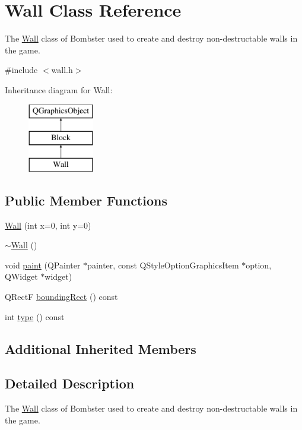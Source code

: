 \hypertarget{class_wall}{\section{Wall Class Reference}
\label{class_wall}
}


The \hyperlink{class_wall}{Wall} class of Bombster used to create and destroy non-\/destructable walls in the game.  




{\ttfamily \#include $<$wall.\-h$>$}

Inheritance diagram for Wall\-:\begin{figure}[H]
\begin{center}
\leavevmode
\includegraphics[height=3.000000cm]{class_wall}
\end{center}
\end{figure}
\subsection*{Public Member Functions}
\begin{DoxyCompactItemize}
\item 
\hyperlink{class_wall_a23004a32bc2720e18793d6db6a5f0fd5}{Wall} (int x=0, int y=0)
\item 
\hyperlink{class_wall_a9a2992f2b533e1c160513d1e719f920c}{$\sim$\-Wall} ()
\item 
void \hyperlink{class_wall_aae57ed47f7d5d58b513d2ebd8feb8057}{paint} (Q\-Painter $\ast$painter, const Q\-Style\-Option\-Graphics\-Item $\ast$option, Q\-Widget $\ast$widget)
\item 
Q\-Rect\-F \hyperlink{class_wall_aae7888200bcd5afb12b24110886366a0}{bounding\-Rect} () const 
\item 
int \hyperlink{class_wall_ab31daa81d4977819c8e231621c7573d7}{type} () const 
\end{DoxyCompactItemize}
\subsection*{Additional Inherited Members}


\subsection{Detailed Description}
The \hyperlink{class_wall}{Wall} class of Bombster used to create and destroy non-\/destructable walls in the game. 

